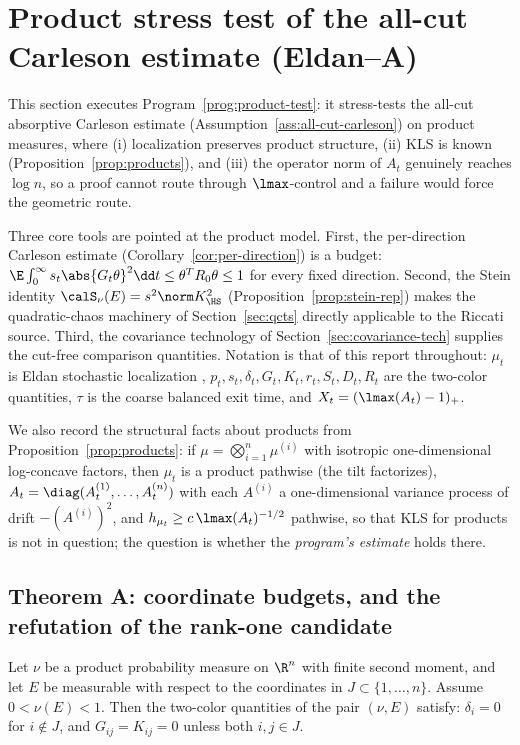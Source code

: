 \documentclass[../../main.tex]{subfiles}
\begin{document}
\section{Product stress test of the all-cut Carleson estimate (Eldan--A)}
\label{sec:product-stress}

This section executes Program~\ref{prog:product-test}: it stress-tests the all-cut absorptive
Carleson estimate (Assumption~\ref{ass:all-cut-carleson}) on product measures, where
(i) localization preserves product structure, (ii) KLS is known
(Proposition~\ref{prop:products}), and (iii) the operator norm of $A_t$ genuinely reaches
$\log n$, so a proof cannot route through $\lmax$-control and a failure would force the
geometric route.

Three core tools are pointed at the product model. First, the per-direction Carleson estimate
(Corollary~\ref{cor:per-direction}) is a budget:
$\E\int_0^\infty s_t\abs{G_t\theta}^2\dd t\le\theta^TR_0\theta\le1$ for every fixed direction.
Second, the Stein identity $\calS_\nu(E)=s^2\norm K_\HS^2$ (Proposition~\ref{prop:stein-rep})
makes the quadratic-chaos machinery of Section~\ref{sec:qcts} directly applicable to the
Riccati source. Third, the covariance technology of Section~\ref{sec:covariance-tech} supplies
the cut-free comparison quantities. Notation is that of this report throughout: $\mu_t$ is
Eldan stochastic localization \cite{Eldan2013ThinShell,LeeVempala2024},
$p_t,s_t,\delta_t,G_t,K_t,r_t,S_t,D_t,R_t$ are the two-color quantities, $\tau$ is the coarse
balanced exit time, and $X_t=(\lmax(A_t)-1)_+$.

We also record the structural facts about products from Proposition~\ref{prop:products}: if
$\mu=\bigotimes_{i=1}^n\mu^{(i)}$ with isotropic one-dimensional log-concave factors, then
$\mu_t$ is a product pathwise (the tilt factorizes), $A_t=\diag(A_t^{(1)},\dots,A_t^{(n)})$
with each $A^{(i)}$ a one-dimensional variance process of drift $-(A^{(i)})^2$, and
$h_{\mu_t}\ge c\,\lmax(A_t)^{-1/2}$ pathwise, so that KLS for products is not in question; the
question is whether the \emph{program's estimate} holds there.

\subsection{Theorem A: coordinate budgets, and the refutation of the rank-one candidate}
\label{sec:budgets}

\begin{lemma}
\label{lem:block}
Let $\nu$ be a product probability measure on $\R^n$ with finite second moment, and let $E$ be
measurable with respect to the coordinates in $J\subset\{1,\dots,n\}$. Assume
$0<\nu(E)<1$. Then the two-color quantities of the pair
$(\nu,E)$ satisfy: $\delta_i=0$ for $i\notin J$, and $G_{ij}=K_{ij}=0$ unless both
$i,j\in J$.
\end{lemma}
\end{document}
